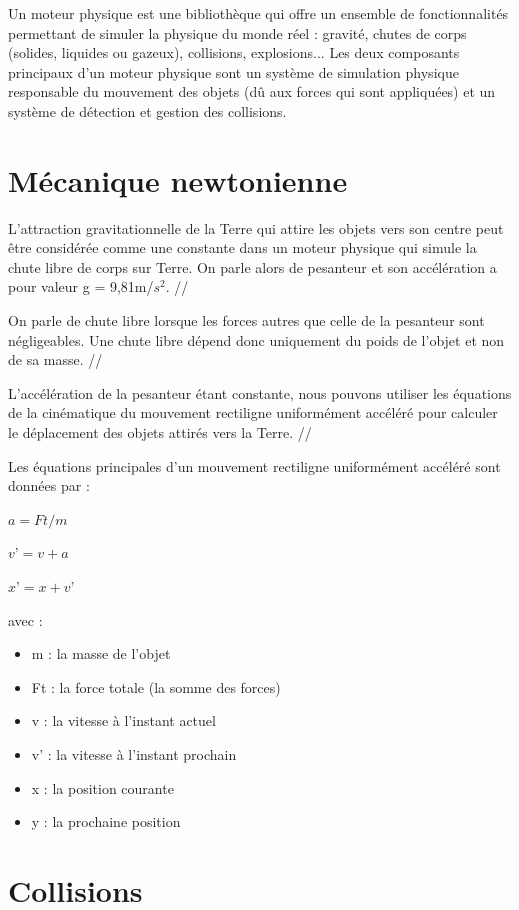 \documentclass{report}
\begin{document}
Un moteur physique est une bibliothèque qui offre un ensemble de fonctionnalités permettant de simuler la physique du monde réel : gravité, chutes de corps (solides, liquides ou gazeux), collisions, explosions... Les deux composants principaux d’un moteur physique sont un système de simulation physique responsable du mouvement des objets (dû aux forces qui sont appliquées) et un système de détection et gestion des collisions.

\section{Mécanique newtonienne}

L’attraction gravitationnelle de la Terre qui attire les objets vers son centre peut être considérée comme une constante dans un moteur physique qui simule la chute libre de corps sur Terre. On parle alors de pesanteur et son accélération a pour valeur g = 9,81m/$s^2$. //

On parle de chute libre lorsque les forces autres que celle de la pesanteur sont négligeables. Une chute libre dépend donc uniquement du poids de l’objet et non de sa masse. //

L’accélération de la pesanteur étant constante, nous pouvons utiliser les équations de la cinématique du mouvement rectiligne uniformément accéléré pour calculer le déplacement des objets attirés vers la Terre. //

Les équations principales d’un mouvement rectiligne uniformément accéléré sont données par :

\(a = Ft / m\)

\(v’ = v + a\)

\(x’ = x + v’\)

avec :
\begin{itemize}
\item m : la masse de l’objet
\item Ft : la force totale (la somme des forces)
\item v : la vitesse à l’instant actuel
\item v’ : la vitesse à l’instant prochain
\item x : la position courante
\item y : la prochaine position
\end{itemize}

\newpage
\section{Collisions}
\end{document}
